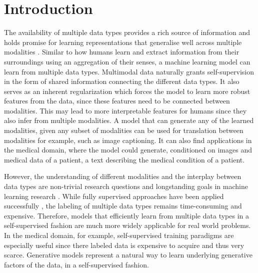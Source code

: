 \chapter{Introduction}
The availability of multiple data types provides a rich source of information and holds promise for learning representations that generalise well across multiple modalities \citep{baltrusaitis_multimodal_2019}.
Similar to how humans learn and extract information from their surroundings using an aggregation of their senses, a machine learning model can learn from multiple data types.
Multimodal data naturally grants self-supervision in the form of shared information connecting the different data types.
It also serves as an inherent regularization which forces the model to learn more robust features from the data, since these features need to be connected between modalities.
This may lead to more interpretable features for humans since they also infer from multiple modalities.
A model that can generate any of the learned modalities, given any subset of modalities can be used for translation between modalities for example, such as image captioning.
It can also find applications in the medical domain, where the model could generate, conditioned on images and medical data of a patient, a text describing the medical condition of a patient.

However, the understanding of different modalities and the interplay between data types are non-trivial research questions and longstanding goals in machine learning research \citep{ngiam_multimodal_nodate}.
While fully supervised approaches have been applied successfully \citep{karpathy_deep_2015,tsai_learning_2018}, the labeling of multiple data types remains time-consuming and expensive.
Therefore, models that efficiently learn from multiple data types in a self-supervised fashion are much more widely applicable for real world problems.
In the medical domain, for example, self-supervised training paradigms are especially useful since there labeled data is expensive to acquire and thus very scarce.
Generative models represent a natural way to learn underlying generative factors of the data, in a self-supervised fashion.




